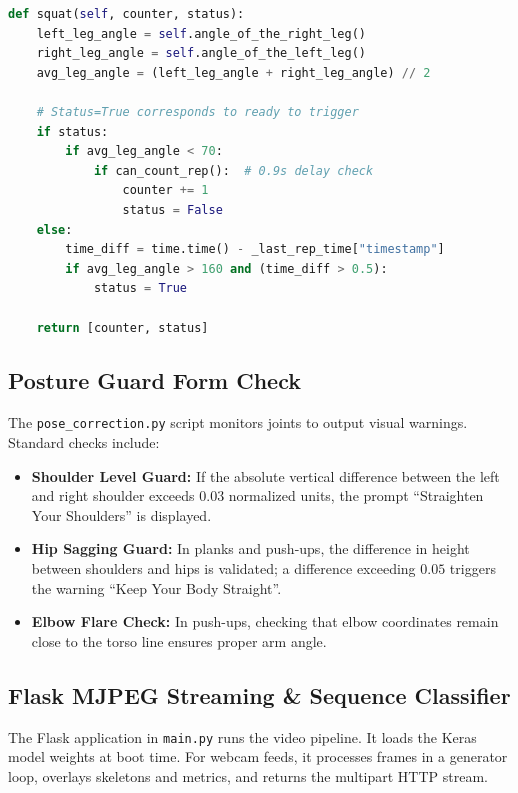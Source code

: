 \begin{lstlisting}[language=Python, caption=Squat Repetition State Machine Code, label=lst:squat_state]
def squat(self, counter, status):
    left_leg_angle = self.angle_of_the_right_leg()
    right_leg_angle = self.angle_of_the_left_leg()
    avg_leg_angle = (left_leg_angle + right_leg_angle) // 2

    # Status=True corresponds to ready to trigger
    if status:
        if avg_leg_angle < 70:
            if can_count_rep():  # 0.9s delay check
                counter += 1
                status = False
    else:
        time_diff = time.time() - _last_rep_time["timestamp"]
        if avg_leg_angle > 160 and (time_diff > 0.5):
            status = True

    return [counter, status]
\end{lstlisting}

\subsection{Posture Guard Form Check}
The \texttt{pose\_correction.py} script monitors joints to output visual warnings. Standard checks include:
\begin{itemize}
    \item \textbf{Shoulder Level Guard:} If the absolute vertical difference between the left and right shoulder exceeds $0.03$ normalized units, the prompt ``Straighten Your Shoulders'' is displayed.
    \item \textbf{Hip Sagging Guard:} In planks and push-ups, the difference in height between shoulders and hips is validated; a difference exceeding $0.05$ triggers the warning ``Keep Your Body Straight''.
    \item \textbf{Elbow Flare Check:} In push-ups, checking that elbow coordinates remain close to the torso line ensures proper arm angle.
\end{itemize}

\subsection{Flask MJPEG Streaming \& Sequence Classifier}
The Flask application in \texttt{main.py} runs the video pipeline. It loads the Keras model weights at boot time. For webcam feeds, it processes frames in a generator loop, overlays skeletons and metrics, and returns the multipart HTTP stream.

